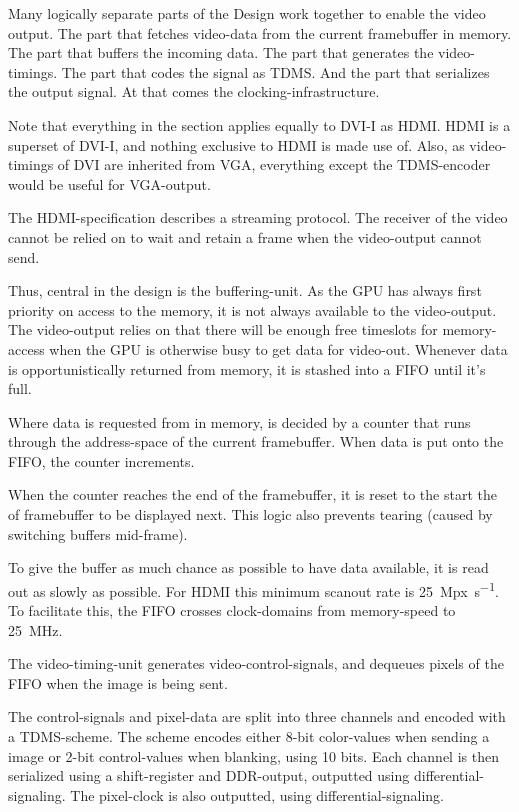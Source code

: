 \documentclass[../main/report.tex]{subfiles}
\begin{document}
Many logically separate parts of the Design work together to enable the video output.
The part that fetches video-data from the current framebuffer in memory.
The part that buffers the incoming data.
The part that generates the video-timings.
The part that codes the signal as TDMS.
And the part that serializes the output signal.
At that comes the clocking-infrastructure.

Note that everything in the section applies equally to DVI-I as HDMI. HDMI is a superset of DVI-I, and nothing exclusive to HDMI is made use of.
Also, as video-timings of DVI are inherited from VGA, everything except the TDMS-encoder would be useful for VGA-output.

The HDMI-specification describes a streaming protocol.
The receiver of the video cannot be relied on to wait and retain a frame when the video-output cannot send.

Thus, central in the design is the buffering-unit.
As the GPU has always first priority on access to the memory, it is not always available to the video-output.
The video-output relies on that there will be enough free timeslots for memory-access when the GPU is otherwise busy to get data for video-out.
Whenever data is opportunistically returned from memory, it is stashed into a FIFO until it's full.

Where data is requested from in memory, is decided by a counter that runs through the address-space of the current framebuffer.
When data is put onto the FIFO, the counter increments. %

When the counter reaches the end of the framebuffer, it is reset to the start the of framebuffer to be displayed next.
This logic also prevents tearing (caused by switching buffers mid-frame).

To give the buffer as much chance as possible to have data available, it is read out as slowly as possible.
For HDMI this minimum scanout rate is \SI{25}{Mpx\per s}.
To facilitate this, the FIFO crosses clock-domains from memory-speed to \SI{25}{MHz}.


The video-timing-unit generates video-control-signals, and dequeues pixels of the FIFO when the image is being sent.

The control-signals and pixel-data are split into three channels and encoded with a TDMS-scheme.
The scheme encodes either 8-bit color-values when sending a image or 2-bit control-values when blanking, using 10 bits.
Each channel is then serialized using a shift-register and DDR-output, outputted using differential-signaling.
The pixel-clock is also outputted, using differential-signaling.
\end{document}
